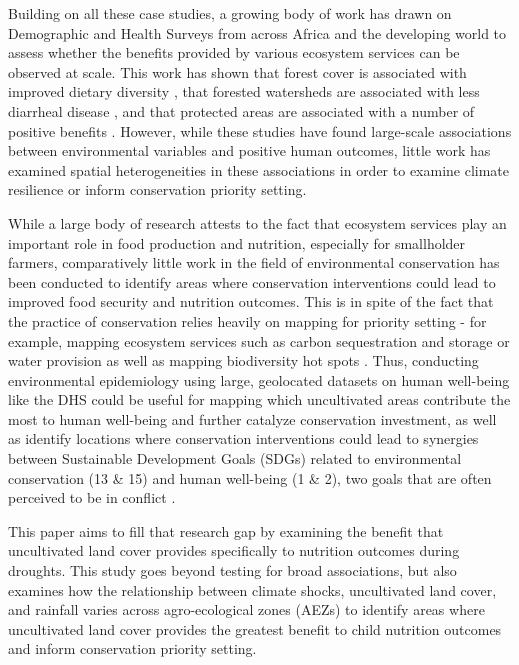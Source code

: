 \documentclass{article}
\begin{document}
Building on all these case studies, a growing body of work has drawn on Demographic and Health Surveys from across Africa and the developing world to assess whether the benefits provided by various ecosystem services can be observed at scale.  This work has shown that forest cover is associated with improved dietary diversity \cite{Ickowitz2014, Rasolofoson2018}, that forested watersheds are associated with less diarrheal disease \cite{Herrera2017}, and that protected areas are associated with a number of positive benefits \cite{naidoo2019evaluating}.  However, while these studies have found large-scale associations between environmental variables and positive human outcomes, little work has examined spatial heterogeneities in these associations in order to examine climate resilience or inform conservation priority setting.

While a large body of research attests to the fact that ecosystem services play an important role in food production and nutrition, especially for smallholder farmers, comparatively little work in the field of environmental conservation has been conducted to identify areas where conservation interventions could lead to improved food security and nutrition outcomes.  This is in spite of the fact that the practice of conservation relies heavily on mapping for priority setting - for example, mapping ecosystem services such as carbon sequestration and storage \cite{Kim2016} or water provision \cite{immerzeel2020importance} as well as mapping biodiversity hot spots \cite{holland2012conservation}.  Thus, conducting environmental epidemiology using large, geolocated datasets on human well-being like the DHS could be useful for mapping which uncultivated areas contribute the most to human well-being and further catalyze conservation investment, as well as identify locations where conservation interventions could lead to synergies between Sustainable Development Goals (SDGs) related to environmental conservation (13 \& 15) and human well-being (1 \& 2), two goals that are often perceived to be in conflict \cite{moore2016improving, mcshane2011hard}.

This paper aims to fill that research gap by examining the benefit that uncultivated land cover provides specifically to nutrition outcomes during droughts.  This study goes beyond testing for broad associations, but also examines how the relationship between climate shocks, uncultivated land cover, and rainfall varies across agro-ecological zones (AEZs) to identify areas where uncultivated land cover provides the greatest benefit to child nutrition outcomes and inform conservation priority setting.
\end{document}
